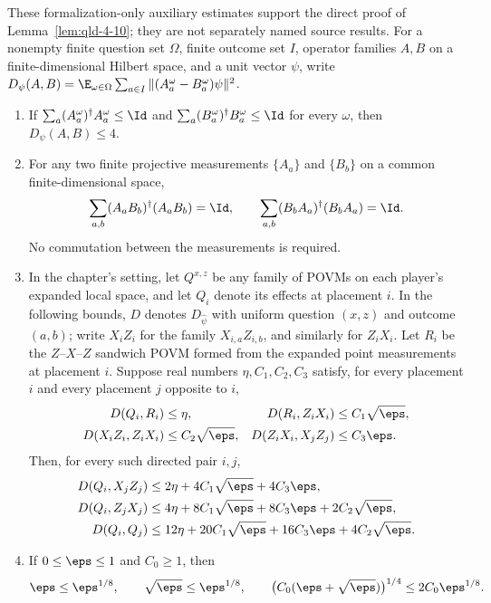 \begin{lemma}
	\label{lem:combined-point-distance-support}
	\leanok
	These formalization-only auxiliary estimates support the direct proof
	of Lemma~\ref{lem:qld-4-10}; they are not separately named source results.
	For a nonempty finite question set $\Omega$, finite outcome set $I$,
	operator families $A,B$ on a finite-dimensional Hilbert space, and a
	unit vector $\psi$, write
	$D_\psi(A,B)=\E_{\omega\in\Omega}\sum_{a\in I}
	\|(A^\omega_a-B^\omega_a)\psi\|^2$.
	\begin{enumerate}
		\item If $\sum_a(A^\omega_a)^\dagger A^\omega_a\leq\Id$ and
		$\sum_a(B^\omega_a)^\dagger B^\omega_a\leq\Id$ for every
		$\omega$, then $D_\psi(A,B)\leq4$.
		\item For any two finite projective measurements $\{A_a\}$ and
		$\{B_b\}$ on a common finite-dimensional space,
		\[
			\sum_{a,b}(A_aB_b)^\dagger(A_aB_b)=\Id,
			\qquad
			\sum_{a,b}(B_bA_a)^\dagger(B_bA_a)=\Id.
		\]
		No commutation between the measurements is required.
		\item In the chapter's setting, let $Q^{x,z}$ be any family of
		POVMs on each player's expanded local space, and let $Q_i$ denote
		its effects at placement $i$. In the following bounds, $D$ denotes
		$D_{\hat\psi}$ with uniform question $(x,z)$ and outcome $(a,b)$;
		write $X_iZ_i$ for the family $X_{i,a}Z_{i,b}$, and similarly for
		$Z_iX_i$. Let $R_i$ be the $Z$--$X$--$Z$ sandwich POVM formed from
		the expanded point measurements at placement $i$. Suppose real
		numbers $\eta,C_1,C_2,C_3$ satisfy, for every placement $i$ and
		every placement $j$ opposite to $i$,
		\begin{align*}
			D(Q_i,R_i)&\leq\eta,& D(R_i,Z_iX_i)&\leq C_1\sqrt\eps,\\
			D(X_iZ_i,Z_iX_i)&\leq C_2\sqrt\eps,&
			D(Z_iX_i,X_jZ_j)&\leq C_3\eps.
		\end{align*}
		Then, for every such directed pair $i,j$,
		\begin{align*}
			D(Q_i,X_jZ_j)&\leq2\eta+4C_1\sqrt\eps+4C_3\eps,\\
			D(Q_i,Z_jX_j)&\leq4\eta+8C_1\sqrt\eps+8C_3\eps+2C_2\sqrt\eps,\\
			D(Q_i,Q_j)&\leq12\eta+20C_1\sqrt\eps+16C_3\eps+4C_2\sqrt\eps.
		\end{align*}
		\item If $0\leq\eps\leq1$ and $C_0\geq1$, then
		\[
			\eps\leq\eps^{1/8},\qquad \sqrt\eps\leq\eps^{1/8},\qquad
			\bigl(C_0(\eps+\sqrt\eps)\bigr)^{1/4}
			\leq2C_0\eps^{1/8}.
		\]
	\end{enumerate}
\end{lemma}
